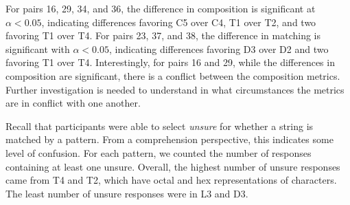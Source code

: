 For pairs 16, 29, 34, and 36, the difference in composition is significant at $\alpha < 0.05$, indicating differences favoring C5 over C4, T1 over T2, and two favoring T1 over T4. 
For pairs 23, 37, and 38, the difference in matching is significant with $\alpha < 0.05$, indicating differences favoring D3 over D2 and two favoring T1 over T4. 
Interestingly, for pairs 16 and 29, while the differences in composition are significant, there is a conflict between the composition metrics. Further investigation is needed to understand in what circumstances the metrics are in conflict with one another. 



Recall that participants were able to select \emph{unsure} for whether a string is matched  by a pattern.
From a comprehension perspective, this indicates some level of confusion.
For each pattern, we counted the number of responses containing at least one unsure.
Overall, the highest number of unsure responses came from T4 and T2, which have octal and hex representations of characters. The least number of unsure responses were in L3 and D3.
